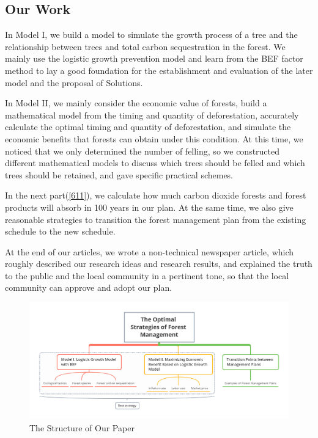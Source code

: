 \documentclass[12pt]{article}
\begin{document}
\subsection{Our Work}
In Model I, we build a model to simulate the growth process of a tree and the
relationship between trees and total carbon sequestration in the forest. We
mainly use the logistic growth prevention model and learn from the BEF factor
method to lay a good foundation for the establishment and evaluation of the
later model and the proposal of Solutions.

In Model II, we mainly consider the economic value of forests, build a
mathematical model from the timing and quantity of deforestation, accurately
calculate the optimal timing and quantity of deforestation, and simulate the
economic benefits that forests can obtain under this condition. At this time,
we noticed that we only determined the number of felling, so we constructed
different mathematical models to discuss which trees should be felled and which
trees should be retained, and gave specific practical schemes.

In the next part(\ref{611}), we calculate how much carbon dioxide forests and
forest products will absorb in 100 years in our plan. At the same time, we also
give reasonable strategies to transition the forest management plan from the
existing schedule to the new schedule.

At the end of our articles, we wrote a non-technical newspaper article, which
roughly described our research ideas and research results, and explained the
truth to the public and the local community in a pertinent tone, so that the
local community can approve and adopt our plan.
\begin{figure}[htb]
    \centering
    \includegraphics[width=17cm]{xmind.png}
    \caption{The Structure of Our Paper}
\end{figure}
\end{document}
